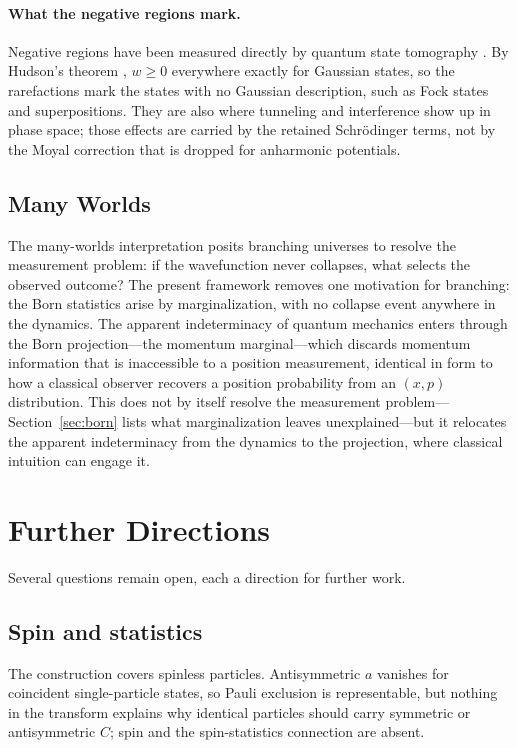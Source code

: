 \documentclass[12pt]{article}
\begin{document}
\paragraph{What the negative regions mark.}
Negative regions have been measured directly by quantum state tomography \cite{leibfried1996}.
By Hudson's theorem \cite{hudson1974}, $w \geq 0$ everywhere exactly for Gaussian states, so the rarefactions mark the states with no Gaussian description, such as Fock states and superpositions.
They are also where tunneling and interference show up in phase space; those effects are carried by the retained Schr\"odinger terms, not by the Moyal correction that is dropped for anharmonic potentials.

\subsection{Many Worlds}

The many-worlds interpretation \cite{everett1973} posits branching universes to resolve the measurement problem: if the wavefunction never collapses, what selects the observed outcome?
The present framework removes one motivation for branching: the Born statistics arise by marginalization, with no collapse event anywhere in the dynamics.
The apparent indeterminacy of quantum mechanics enters through the Born projection---the momentum marginal---which discards momentum information that is inaccessible to a position measurement, identical in form to how a classical observer recovers a position probability from an $(x,p)$ distribution.
This does not by itself resolve the measurement problem---Section~\ref{sec:born} lists what marginalization leaves unexplained---but it relocates the apparent indeterminacy from the dynamics to the projection, where classical intuition can engage it.


\section{Further Directions}\label{sec:further}

Several questions remain open, each a direction for further work.

\subsection{Spin and statistics}
The construction covers spinless particles.  Antisymmetric $a$ vanishes for coincident single-particle states, so Pauli exclusion is representable, but nothing in the transform explains why identical particles should carry symmetric or antisymmetric $C$; spin and the spin-statistics connection are absent.
\end{document}
